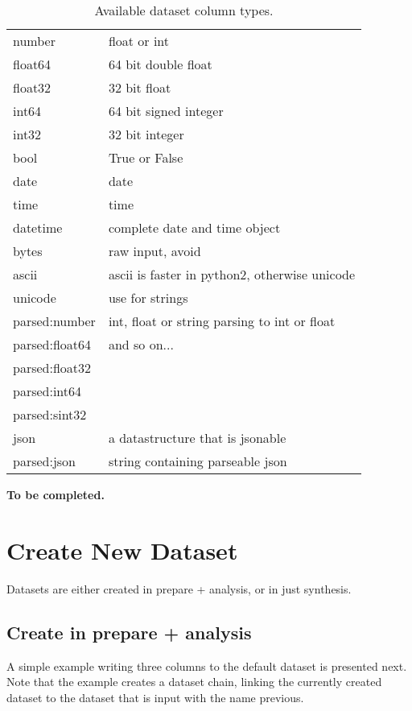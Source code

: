 \begin{table}[h!]
 \begin{tabular}{ll}
  \hline
    number    &  float or int\\
    float64   &  64 bit double float\\
    float32   &  32 bit float\\
    int64     &  64 bit signed integer\\
    int32     &  32 bit integer\\
    bool      &  True or False\\
    date      &  date\\
    time      &  time\\
    datetime  &  complete date and time object\\
    bytes     &  raw input, avoid \\
    ascii     &  ascii is faster in python2, otherwise unicode\\
    unicode   &  use for strings\\
    parsed:number   & int, float or string parsing to int or float \\
    parsed:float64  &  and so on...\\
    parsed:float32  &  \\
    parsed:int64    &  \\
    parsed:sint32   &  \\
    json            &  a datastructure that is jsonable\\
    parsed:json     &  string containing parseable json\\
  \hline
 \end{tabular}
 \caption{Available dataset column types.}
\end{table}
\textbf{To be completed.}


\newpage
\section{Create New Dataset}
Datasets are either created in prepare + analysis, or in just
synthesis.

\subsection{Create in prepare + analysis}
A simple example writing three columns to the default dataset is
presented next.  Note that the example creates a dataset chain,
linking the currently created dataset to the dataset that is input
with the name previous.


